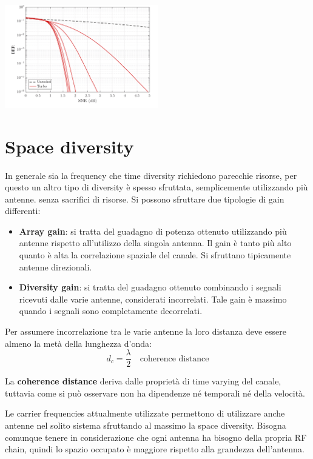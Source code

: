 \begin{center}
    
\includegraphics[width=0.5\textwidth]{imgs/turbo_code_ber.png}
\end{center}

\section*{Space diversity}

In generale sia la frequency che time diversity richiedono parecchie risorse, per questo un altro tipo di diversity è spesso sfruttata, semplicemente utilizzando più antenne. senza sacrifici di risorse. Si possono sfruttare due tipologie di gain differenti:
\begin{itemize}
    \item \textbf{Array gain}: si tratta del guadagno di potenza ottenuto utilizzando più antenne rispetto all'utilizzo della singola antenna. Il gain è tanto più alto quanto è alta la correlazione spaziale del canale. Si sfruttano tipicamente antenne direzionali.
    \item \textbf{Diversity gain}: si tratta del guadagno ottenuto combinando i segnali ricevuti dalle varie antenne, considerati incorrelati. Tale gain è massimo quando i segnali sono completamente decorrelati. 
\end{itemize} 

Per assumere incorrelazione tra le varie antenne la loro distanza deve essere almeno la metà della lunghezza d'onda:
\[
    d_c = \frac{\lambda}{2} \quad \text{coherence distance}
\]  

La \textbf{coherence distance} deriva dalle proprietà di time varying del canale, tuttavia come si può osservare non ha dipendenze né temporali né della velocità.

Le carrier frequencies attualmente utilizzate permettono di utilizzare anche antenne nel solito sistema sfruttando al massimo la space diversity. Bisogna comunque tenere in considerazione che ogni antenna ha bisogno della propria RF chain, quindi lo spazio occupato è maggiore rispetto alla grandezza dell'antenna.


